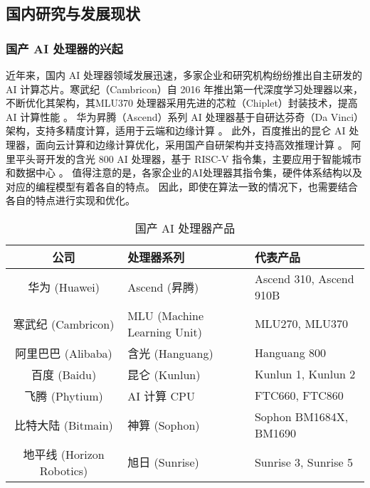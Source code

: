 \subsection{国内研究与发展现状}

\subsubsection{国产 AI 处理器的兴起}

近年来，国内 AI 处理器领域发展迅速，多家企业和研究机构纷纷推出自主研发的 AI 计算芯片。寒武纪（Cambricon）自 2016 年推出第一代深度学习处理器以来，
不断优化其架构，其MLU370 处理器采用先进的芯粒（Chiplet）封装技术，提高 AI 计算性能 \cite{song2023cambricon}。
华为昇腾（Ascend）系列 AI 处理器基于自研达芬奇（Da Vinci）架构，支持多精度计算，适用于云端和边缘计算 \cite{liao2021ascend}。
此外，百度推出的昆仑 AI 处理器，面向云计算和边缘计算优化，采用国产自研架构并支持高效推理计算 \cite{zhang2023intelligent}。
阿里平头哥开发的含光 800 AI 处理器，基于 RISC-V 指令集，主要应用于智能城市和数据中心 \cite{reuther2020survey}。
值得注意的是，各家企业的AI处理器其指令集，硬件体系结构以及对应的编程模型有着各自的特点。
因此，即使在算法一致的情况下，也需要结合各自的特点进行实现和优化。

\begin{table}
    \centering
    \caption{国产 AI 处理器产品}
    \label{tab:ai_chips_1}
    \begin{tabular}{cll} %
      \toprule
      公司   & 处理器系列                                       & 代表产品                          \\
      \midrule
      {华为 (Huawei)} & Ascend (昇腾) & Ascend 310, Ascend 910B \\ 
      {寒武纪 (Cambricon)} & MLU (Machine Learning Unit) & MLU270, MLU370 \\ 
      {阿里巴巴 (Alibaba)} & 含光 (Hanguang) & Hanguang 800 \\ 
      {百度 (Baidu)} & 昆仑 (Kunlun) & Kunlun 1, Kunlun 2 \\ 
      {飞腾 (Phytium)} & AI 计算 CPU & FTC660, FTC860 \\ 
      {比特大陆 (Bitmain)} & 神算 (Sophon) & Sophon BM1684X, BM1690 \\ 
      {地平线 (Horizon Robotics)} & 旭日 (Sunrise) & Sunrise 3, Sunrise 5 \\ 
 
      \bottomrule
    \end{tabular}
\end{table}

